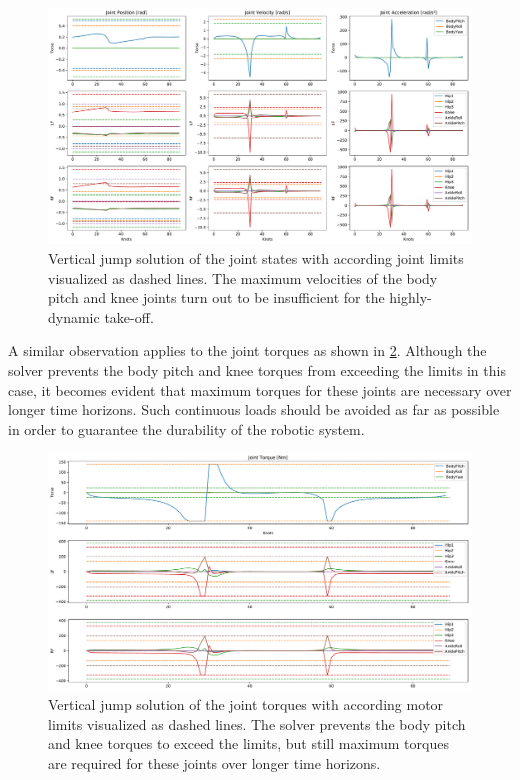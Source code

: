 \begin{figure}[h!]
\centering	
\includegraphics[width=1\textwidth]{fig/jumpVertical/JointState}
\caption[Vertical jump solution according joint limits]{Vertical jump solution of the joint states with according joint limits visualized as dashed lines. The maximum velocities of the body pitch and knee joints turn out to be insufficient for the highly-dynamic take-off.}
\label{fig:jumpVertical_JointState}
\end{figure} 

A similar observation applies to the joint torques as shown in \cref{fig:jumpVertical_JointTorques}. Although the solver prevents the body pitch and knee torques from exceeding the limits in this case, it becomes evident that maximum torques for these joints are necessary over longer time horizons. Such continuous loads should be avoided as far as possible in order to guarantee the durability of the robotic system.

\begin{figure}
\centering	
\includegraphics[width=1\textwidth]{fig/jumpVertical/JointTorques}
\caption[Vertical jump solution with according torque limits]{Vertical jump solution of the joint torques with according motor limits visualized as dashed lines. The solver prevents the body pitch and knee torques to exceed the limits, but still maximum torques are required for these joints over longer time horizons.}
\label{fig:jumpVertical_JointTorques}
\end{figure} 

